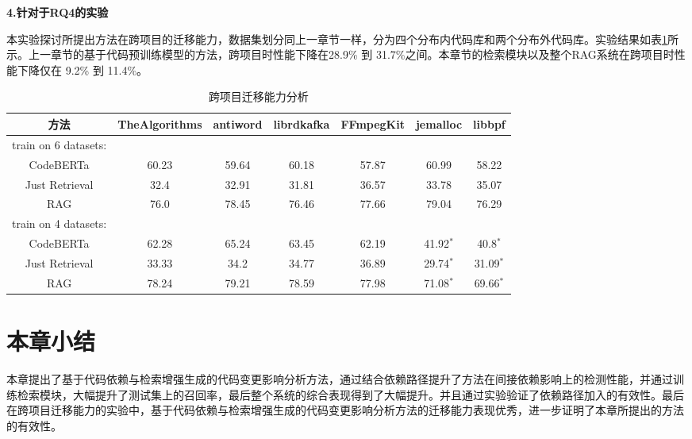 \textbf{4.针对于RQ4的实验}

本实验探讨所提出方法在跨项目的迁移能力，数据集划分同上一章节一样，分为四个分布内代码库和两个分布外代码库。实验结果如表\ref{2_跨项目迁移能力分析}所示。上一章节的基于代码预训练模型的方法，跨项目时性能下降在28.9\% 到 31.7\%之间。本章节的检索模块以及整个RAG系统在跨项目时性能下降仅在 9.2\% 到 11.4\%。


\begin{table}[htbp]
\caption{跨项目迁移能力分析}
\label{2_跨项目迁移能力分析}
\vspace{0.5em}\centering\wuhao
\begin{tabular}{c|cccc|cc}
\toprule
方法& TheAlgorithms & antiword & librdkafka & FFmpegKit & jemalloc & libbpf\\
\midrule
train on 6 datasets:\\
\midrule
CodeBERTa  &  60.23 & 59.64 & 60.18 & 57.87 & 60.99 & 58.22 \\
Just Retrieval   & 32.4 & 32.91 & 31.81 & 36.57 & 33.78 & 35.07  \\
RAG & 76.0 & 78.45 & 76.46 & 77.66 & 79.04 & 76.29  \\
\midrule
train on 4 datasets:\\
\midrule
CodeBERTa  &  62.28 & 65.24 & 63.45 & 62.19 & 41.92$^*$ & 40.8$^*$\\
Just Retrieval   & 33.33 & 34.2 & 34.77 & 36.89 & 29.74$^*$ & 31.09$^*$ \\
RAG & 78.24 & 79.21 & 78.59 & 77.98 & 71.08$^*$ & 69.66$^*$ \\
\bottomrule
\end{tabular}
\end{table}
 

\section{本章小结}

本章提出了基于代码依赖与检索增强生成的代码变更影响分析方法，通过结合依赖路径提升了方法在间接依赖影响上的检测性能，并通过训练检索模块，大幅提升了测试集上的召回率，最后整个系统的综合表现得到了大幅提升。并且通过实验验证了依赖路径加入的有效性。最后在跨项目迁移能力的实验中，基于代码依赖与检索增强生成的代码变更影响分析方法的迁移能力表现优秀，进一步证明了本章所提出的方法的有效性。

